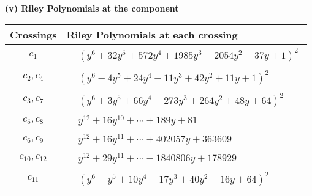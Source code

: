 \documentclass[1p]{elsarticle_modified}
\theoremstyle{definition}
\begin{document}
\flushleft \textbf{(v) Riley Polynomials at the component}\newline \\
\begin{tabular}{m{50pt}|m{274pt}}
Crossings & \hspace{64pt}Riley Polynomials at each crossing \\
\hline $$\begin{aligned}c_{1}\end{aligned}$$&$\begin{aligned}
&(y^6+32 y^5+572 y^4+1985 y^3+2054 y^2-37 y+1)^2
\end{aligned}$\\
\hline $$\begin{aligned}c_{2},c_{4}\end{aligned}$$&$\begin{aligned}
&(y^6-4 y^5+24 y^4-11 y^3+42 y^2+11 y+1)^2
\end{aligned}$\\
\hline $$\begin{aligned}c_{3},c_{7}\end{aligned}$$&$\begin{aligned}
&(y^6+3 y^5+66 y^4-273 y^3+264 y^2+48 y+64)^2
\end{aligned}$\\
\hline $$\begin{aligned}c_{5},c_{8}\end{aligned}$$&$\begin{aligned}
&y^{12}+16 y^{10}+\cdots+189 y+81
\end{aligned}$\\
\hline $$\begin{aligned}c_{6},c_{9}\end{aligned}$$&$\begin{aligned}
&y^{12}+16 y^{11}+\cdots+402057 y+363609
\end{aligned}$\\
\hline $$\begin{aligned}c_{10},c_{12}\end{aligned}$$&$\begin{aligned}
&y^{12}+29 y^{11}+\cdots-1840806 y+178929
\end{aligned}$\\
\hline $$\begin{aligned}c_{11}\end{aligned}$$&$\begin{aligned}
&(y^6- y^5+10 y^4-17 y^3+40 y^2-16 y+64)^2
\end{aligned}$\\
\hline
\end{tabular}\\~\\
\end{document}
